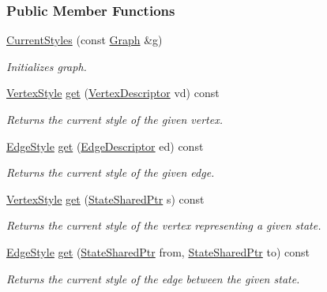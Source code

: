 \subsubsection*{Public Member Functions}
\begin{DoxyCompactItemize}
\item 
\hyperlink{structslb_1_1core_1_1ui_1_1CurrentStyles_ab74d558873a0fab90d5ceace8aa2079d}{Current\+Styles} (const \hyperlink{structslb_1_1core_1_1ui_1_1CurrentStyles_ac27c6fba620b638233a5c620f68c89bc}{Graph} \&g)\hypertarget{structslb_1_1core_1_1ui_1_1CurrentStyles_ab74d558873a0fab90d5ceace8aa2079d}{}\label{structslb_1_1core_1_1ui_1_1CurrentStyles_ab74d558873a0fab90d5ceace8aa2079d}

\begin{DoxyCompactList}\small\item\em Initializes graph. \end{DoxyCompactList}\item 
\hyperlink{structslb_1_1core_1_1ui_1_1VertexStyle}{Vertex\+Style} \hyperlink{structslb_1_1core_1_1ui_1_1CurrentStyles_a201c59d8806f1a6eace1df2dff8143c6}{get} (\hyperlink{structslb_1_1core_1_1ui_1_1CurrentStyles_a5da5348d833acc6d19d20556f00765b9}{Vertex\+Descriptor} vd) const 
\begin{DoxyCompactList}\small\item\em Returns the current style of the given vertex. \end{DoxyCompactList}\item 
\hyperlink{structslb_1_1core_1_1ui_1_1EdgeStyle}{Edge\+Style} \hyperlink{structslb_1_1core_1_1ui_1_1CurrentStyles_ac251d1fbd39198cb34642e7138727495}{get} (\hyperlink{structslb_1_1core_1_1ui_1_1CurrentStyles_aa63947c6380258a6f5147c75d3168e2a}{Edge\+Descriptor} ed) const 
\begin{DoxyCompactList}\small\item\em Returns the current style of the given edge. \end{DoxyCompactList}\item 
\hyperlink{structslb_1_1core_1_1ui_1_1VertexStyle}{Vertex\+Style} \hyperlink{structslb_1_1core_1_1ui_1_1CurrentStyles_ae2f28e0dcb6e8d38a6710a7b0f21e568}{get} (\hyperlink{structslb_1_1core_1_1ui_1_1CurrentStyles_a2e3a5865892f484dcf9c94ac70bc19c2}{State\+Shared\+Ptr} s) const 
\begin{DoxyCompactList}\small\item\em Returns the current style of the vertex representing a given state. \end{DoxyCompactList}\item 
\hyperlink{structslb_1_1core_1_1ui_1_1EdgeStyle}{Edge\+Style} \hyperlink{structslb_1_1core_1_1ui_1_1CurrentStyles_a7a75762ed7d0343867b5bf29c08b7b81}{get} (\hyperlink{structslb_1_1core_1_1ui_1_1CurrentStyles_a2e3a5865892f484dcf9c94ac70bc19c2}{State\+Shared\+Ptr} from, \hyperlink{structslb_1_1core_1_1ui_1_1CurrentStyles_a2e3a5865892f484dcf9c94ac70bc19c2}{State\+Shared\+Ptr} to) const 
\begin{DoxyCompactList}\small\item\em Returns the current style of the edge between the given state. \end{DoxyCompactList}\end{DoxyCompactItemize}
